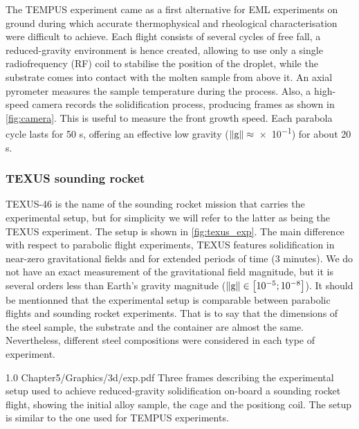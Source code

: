The TEMPUS experiment came as a first alternative for EML experiments on ground during which accurate thermophysical and rheological characterisation were difficult to achieve.
Each flight consists of several cycles of free fall, a reduced-gravity environment is hence created, 
allowing to use only a single radiofrequency (RF) coil to stabilise the position of the droplet, while the substrate comes into contact with the molten sample
from above it. An axial pyrometer measures the sample temperature during the process. 
Also, a high-speed camera records the solidification process, producing frames as shown in \cref{fig:camera}.
This is useful to measure the front growth speed. 
Each parabola cycle lasts for 50 s, offering an effective low gravity ($\lVert \boldsymbol{\text{g}} \rVert\approx$\SI{e-1}{\uacceleration}) for about 20 s.

\subsubsection{TEXUS sounding rocket}

TEXUS-46 is the name of the sounding rocket mission that carries the experimental setup, 
but for simplicity we will refer to the latter as being the TEXUS experiment. The setup is shown in \cref{fig:texus_exp}.
The main difference with respect to parabolic flight experiments,
TEXUS features solidification in near-zero gravitational fields and for extended periods of time (3 minutes). 
We do not have an exact measurement of the gravitational field magnitude, but it is several orders
less than Earth's gravity magnitude ($\lVert \boldsymbol{\text{g}} \rVert \in \left[ 10^{-5};10^{-8} \right]$\si{\uacceleration}).
It should be mentionned that the experimental setup is comparable between parabolic flights and sounding rocket experiments. That is to say
that the dimensions of the steel sample, the substrate and the container are almost the same. Nevertheless, different steel compositions were
considered in each type of experiment.

\begin{figureth}
{1.0}
{Chapter5/Graphics/3d/exp.pdf}
{Three frames describing the experimental setup used to achieve reduced-gravity 
solidification on-board a sounding rocket flight,
showing the initial alloy sample, the cage and the positiong coil. The setup
is similar to the one used for TEMPUS experiments.}
\label{fig:texus_exp}
\end{figureth}

